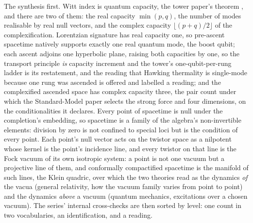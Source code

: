 \documentclass[11pt]{article}
\theoremstyle{definition}
\theoremstyle{plain}
\begin{document}
The synthesis first. Witt index is quantum capacity, the tower paper's theorem \cite[Thm.~4.3]{ButlerT3}, and there are two of them: the real capacity $\min(p,q)$, the number of modes realisable by real null vectors, and the complex capacity $\lfloor (p+q)/2 \rfloor$ of the complexification. Lorentzian signature has real capacity one, so pre-ascent spacetime natively supports exactly one real quantum mode, the boost qubit; each ascent adjoins one hyperbolic plane, raising both capacities by one, so the transport principle \emph{is} capacity increment and the tower's one-qubit-per-rung ladder is its restatement, and the reading that Hawking thermality is single-mode because one rung was ascended is offered and labelled a reading; and the complexified ascended space has complex capacity three, the pair count under which the Standard-Model paper selects the strong force and four dimensions, on the conditionalities it declares. Every point of spacetime is null under the completion's embedding, so spacetime is a family of the algebra's non-invertible elements: division by zero is not confined to special loci but is the condition of every point. Each point's null vector acts on the twistor space as a nilpotent whose kernel is the point's incidence line, and every twistor on that line is the Fock vacuum of its own isotropic system: a point is not one vacuum but a projective line of them, and conformally compactified spacetime is the manifold of such lines, the Klein quadric, over which the two theories read as the dynamics \emph{of} the vacua (general relativity, how the vacuum family varies from point to point) and the dynamics \emph{above} a vacuum (quantum mechanics, excitations over a chosen vacuum). The series' internal cross-checks are then sorted by level: one count in two vocabularies, an identification, and a reading.
\end{document}
